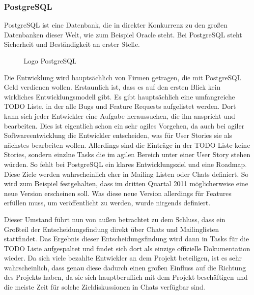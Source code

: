 \subsubsection{PostgreSQL}
PostgreSQL ist eine Datenbank, die in direkter Konkurrenz zu den großen Datenbanken dieser Welt, wie zum Beispiel Oracle steht. Bei PostgreSQL steht Sicherheit und Beständigkeit an erster Stelle.
\begin{figure}[h]
	\centering
	\caption{Logo PostgreSQL}
	\label{pgLogo}
\end{figure}
Die Entwicklung wird hauptsächlich von Firmen getragen, die mit Post\-gre\-SQL Geld verdienen wollen. Erstaunlich ist, dass es auf den ersten Blick kein wirkliches Entwicklungsmodell gibt. Es gibt hauptsächlich eine umfangreiche TODO Liste, in der alle Bugs und Feature Requests aufgelistet werden. Dort kann sich jeder Entwickler eine Aufgabe heraussuchen, die ihn anspricht und bearbeiten. Dies ist eigentlich schon ein sehr agiles Vorgehen, da auch bei agiler Softwareentwicklung die Entwickler entscheiden, was für User Stories sie als nächstes bearbeiten wollen. Allerdings sind die Einträge in der TODO Liste keine Stories, sondern einzlne Tasks die im agilen Bereich unter einer User Story stehen würden. So fehlt bei PostgreSQL ein klares Entwicklungsziel und eine Roadmap. Diese Ziele werden wahrscheinlich eher in Mailing Listen oder Chats definiert. So wird zum Beispiel festgehalten, dass im dritten Quartal 2011 möglicherweise eine neue Version erscheinen soll. Was diese neue Version allerdings für Features erfüllen muss, um veröffentlicht zu werden, wurde nirgends definiert.

Dieser Umstand führt nun von außen betrachtet zu dem Schluss, dass ein Großteil der Entscheidungsfindung direkt über Chats und Mailinglisten stattfindet. Das Ergebnis dieser Entscheidungsfindung wird dann in Tasks für die TODO Liste aufgespaltet und findet sich dort als einzige offizielle Dokumentation wieder. Da sich viele bezahlte Entwickler an dem Projekt beteiligen, ist es sehr wahrscheinlich, dass genau diese dadurch einen großen Einfluss auf die Richtung des Projekts haben, da sie sich hauptberuflich mit dem Projekt beschäftigen und die meiste Zeit für solche Zieldiskussionen in Chats verfügbar sind.

